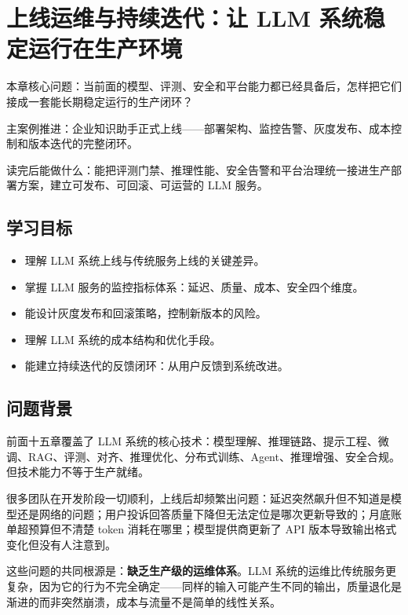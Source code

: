 \chapter{上线运维与持续迭代：让 LLM 系统稳定运行在生产环境}

\begin{introduction}
\item {\heiti 本章核心问题}：当前面的模型、评测、安全和平台能力都已经具备后，怎样把它们接成一套能长期稳定运行的生产闭环？
\item {\heiti 主案例推进}：企业知识助手正式上线——部署架构、监控告警、灰度发布、成本控制和版本迭代的完整闭环。
\item {\heiti 读完后能做什么}：能把评测门禁、推理性能、安全告警和平台治理统一接进生产部署方案，建立可发布、可回滚、可运营的 LLM 服务。
\end{introduction}

\section{学习目标}
\begin{itemize}
  \item 理解 LLM 系统上线与传统服务上线的关键差异。
  \item 掌握 LLM 服务的监控指标体系：延迟、质量、成本、安全四个维度。
  \item 能设计灰度发布和回滚策略，控制新版本的风险。
  \item 理解 LLM 系统的成本结构和优化手段。
  \item 能建立持续迭代的反馈闭环：从用户反馈到系统改进。
\end{itemize}

\section{问题背景}
前面十五章覆盖了 LLM 系统的核心技术：模型理解、推理链路、提示工程、微调、RAG、评测、对齐、推理优化、分布式训练、Agent、推理增强、安全合规。但技术能力不等于生产就绪。

很多团队在开发阶段一切顺利，上线后却频繁出问题：延迟突然飙升但不知道是模型还是网络的问题；用户投诉回答质量下降但无法定位是哪次更新导致的；月底账单超预算但不清楚 token 消耗在哪里；模型提供商更新了 API 版本导致输出格式变化但没有人注意到。

这些问题的共同根源是：\textbf{缺乏生产级的运维体系}。LLM 系统的运维比传统服务更复杂，因为它的行为不完全确定——同样的输入可能产生不同的输出，质量退化是渐进的而非突然崩溃，成本与流量不是简单的线性关系。

